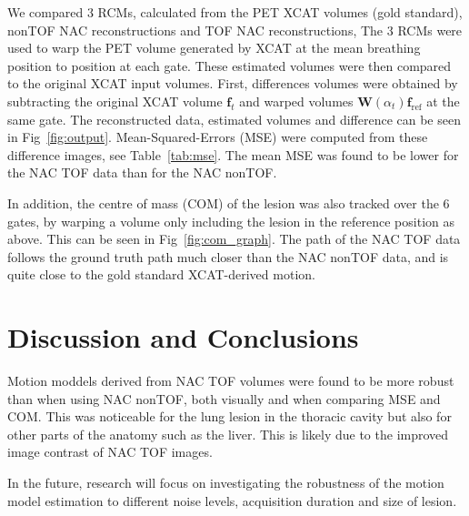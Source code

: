 \documentclass[portrait,color=UCLburgundy,margin=3cm]{uclposter}
\begin{document}
\begin{multicols}{4}
We compared $3$ RCMs, calculated from the PET XCAT volumes (gold standard), nonTOF NAC reconstructions and TOF NAC reconstructions, The $3$ RCMs were used to warp the PET volume generated by XCAT at the mean breathing position to position at each gate. These estimated volumes were then compared to the original XCAT input volumes. First, differences volumes were obtained by subtracting the original XCAT volume $\mathbf{f}_t$ and warped volumes $\mathbf{W}(\alpha_t) \mathbf{f}_\mathrm{ref}$ at the same gate. The reconstructed data, estimated volumes and difference can be seen in Fig~\ref{fig:output}. Mean-Squared-Errors (MSE) were computed from these difference images, see Table~\ref{tab:mse}. The mean MSE was found to be lower for the NAC TOF data than for the NAC nonTOF.

In addition, the centre of mass (COM) of the lesion was also tracked over the $6$ gates, by warping a volume only including the lesion in the reference position as above. This can be seen in Fig~\ref{fig:com_graph}. The path of the NAC TOF data follows the ground truth path much closer than the NAC nonTOF data, and is quite close to the gold standard XCAT-derived motion.

\section*{Discussion and Conclusions}
Motion moddels derived from NAC TOF volumes were found to be more robust than when using NAC nonTOF, both visually and when comparing MSE and COM. This was noticeable for the lung lesion in the thoracic cavity but also for other parts of the anatomy such as the liver. This is likely due to the improved image contrast of NAC TOF images.

In the future, research will focus on investigating the robustness of the motion model estimation to different noise levels, acquisition duration and size of lesion.

\AtNextBibliography{\small}
\printbibliography

\end{multicols}
\end{document}
